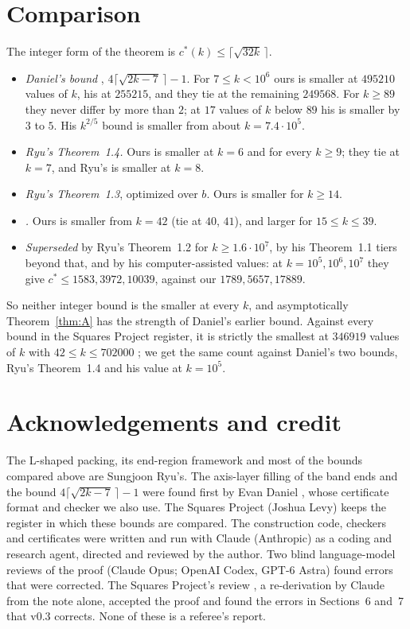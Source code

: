 \documentclass[11pt,letterpaper]{amsart}
\theoremstyle{plain}
\theoremstyle{remark}
\newcommand{\cs}{c^{*}}
\begin{document}
\section{Comparison}

The integer form of the theorem is $\cs(k)\le\lceil\sqrt{32k}\,\rceil$.
\begin{itemize}
\item \emph{Daniel's bound} \cite{Dan26b}, $4\lceil\sqrt{2k-7}\,\rceil-1$. For $7\le k<10^6$ ours is smaller at $495210$ values of $k$, his at $255215$, and they tie at the remaining $249568$. For $k\ge89$ they never differ by more than $2$; at $17$ values of $k$ below $89$ his is smaller by $3$ to $5$. His $k^{2/5}$ bound is smaller from about $k=7.4\cdot10^5$.
\item \emph{Ryu's Theorem~1.4.} Ours is smaller at $k=6$ and for every $k\ge9$; they tie at $k=7$, and Ryu's is smaller at $k=8$.
\item \emph{Ryu's Theorem~1.3}, optimized over $b$. Ours is smaller for $k\ge14$.
\item \emph{\cite{Fan26a}.} Ours is smaller from $k=42$ (tie at $40$, $41$), and larger for $15\le k\le39$.
\item \emph{Superseded} by Ryu's Theorem~1.2 for $k\ge1.6\cdot10^7$, by his Theorem~1.1 tiers beyond that, and by his computer-assisted values: at $k=10^5,10^6,10^7$ they give $\cs\le1583,3972,10039$, against our $1789,5657,17889$.
\end{itemize}
So neither integer bound is the smaller at every $k$, and asymptotically Theorem~\ref{thm:A} has the strength of Daniel's earlier bound. Against every bound in the Squares Project register, it is strictly the smallest at $346919$ values of $k$ with $42\le k\le702000$ \cite{Lev26}; we get the same count against Daniel's two bounds, Ryu's Theorem~1.4 and his value at $k=10^5$.

\section*{Acknowledgements and credit}

The L-shaped packing, its end-region framework and most of the bounds compared above are Sungjoon Ryu's. The axis-layer filling of the band ends and the bound $4\lceil\sqrt{2k-7}\,\rceil-1$ were found first by Evan Daniel \cite{Dan26b}, whose certificate format and checker we also use. The Squares Project (Joshua Levy) keeps the register in which these bounds are compared. The construction code, checkers and certificates were written and run with Claude (Anthropic) as a coding and research agent, directed and reviewed by the author. Two blind language-model reviews of the proof (Claude Opus; OpenAI Codex, GPT-6 Astra) found errors that were corrected. The Squares Project's review \cite{Lev26}, a re-derivation by Claude from the note alone, accepted the proof and found the errors in Sections~6 and~7 that v0.3 corrects. None of these is a referee's report.
\end{document}
